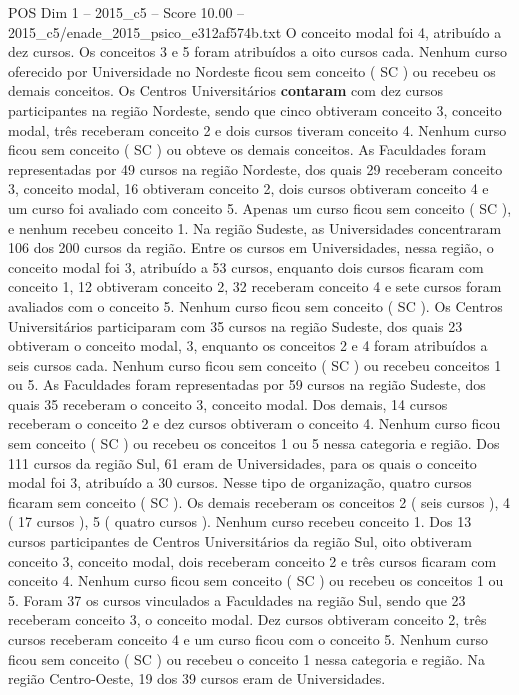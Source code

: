 \begin{textsample}{POS Dim 1 – 2015\_c5 – Score 10.00 – 2015\_c5/enade\_2015\_psico\_e312af574b.txt}
O conceito modal foi 4, atribuído a dez cursos.
Os conceitos 3 e 5 foram atribuídos a oito cursos cada.
Nenhum curso oferecido por Universidade no Nordeste ficou sem conceito ( SC ) ou recebeu os demais conceitos.
Os Centros Universitários \textbf{contaram} com dez cursos participantes na região Nordeste, sendo que cinco obtiveram conceito 3, conceito modal, três receberam conceito 2 e dois cursos tiveram conceito 4.
Nenhum curso ficou sem conceito ( SC ) ou obteve os demais conceitos.
As Faculdades foram representadas por 49 cursos na região Nordeste, dos quais 29 receberam conceito 3, conceito modal, 16 obtiveram conceito 2, dois cursos obtiveram conceito 4 e um curso foi avaliado com conceito 5.
Apenas um curso ficou sem conceito ( SC ), e nenhum recebeu conceito 1.
Na região Sudeste, as Universidades concentraram 106 dos 200 cursos da região.
Entre os cursos em Universidades, nessa região, o conceito modal foi 3, atribuído a 53 cursos, enquanto dois cursos ficaram com conceito 1, 12 obtiveram conceito 2, 32 receberam conceito 4 e sete cursos foram avaliados com o conceito 5.
Nenhum curso ficou sem conceito ( SC ).
Os Centros Universitários participaram com 35 cursos na região Sudeste, dos quais 23 obtiveram o conceito modal, 3, enquanto os conceitos 2 e 4 foram atribuídos a seis cursos cada.
Nenhum curso ficou sem conceito ( SC ) ou recebeu conceitos 1 ou 5.
As Faculdades foram representadas por 59 cursos na região Sudeste, dos quais 35 receberam o conceito 3, conceito modal.
Dos demais, 14 cursos receberam o conceito 2 e dez cursos obtiveram o conceito 4.
Nenhum curso ficou sem conceito ( SC ) ou recebeu os conceitos 1 ou 5 nessa categoria e região.
Dos 111 cursos da região Sul, 61 eram de Universidades, para os quais o conceito modal foi 3, atribuído a 30 cursos.
Nesse tipo de organização, quatro cursos ficaram sem conceito ( SC ).
Os demais receberam os conceitos 2 ( seis cursos ), 4 ( 17 cursos ), 5 ( quatro cursos ).
Nenhum curso recebeu conceito 1.
Dos 13 cursos participantes de Centros Universitários da região Sul, oito obtiveram conceito 3, conceito modal, dois receberam conceito 2 e três cursos ficaram com conceito 4.
Nenhum curso ficou sem conceito ( SC ) ou recebeu os conceitos 1 ou 5.
Foram 37 os cursos vinculados a Faculdades na região Sul, sendo que 23 receberam conceito 3, o conceito modal.
Dez cursos obtiveram conceito 2, três cursos receberam conceito 4 e um curso ficou com o conceito 5.
Nenhum curso ficou sem conceito ( SC ) ou recebeu o conceito 1 nessa categoria e região.
Na região Centro-Oeste, 19 dos 39 cursos eram de Universidades.

\end{textsample}
